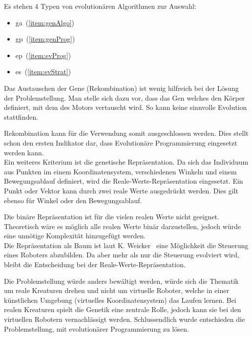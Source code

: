     Es stehen 4 Typen von evolutionären Algorithmen zur Auswahl:

    \begin{itemize}
      \item \acrfull{ga}~(\vref{item:genAlgo})
      \item \acrfull{gp}~(\vref{item:genProg})
      \item \acrfull{ep}~(\vref{item:evProg})
      \item \acrfull{es}~(\vref{item:evStrat})
    \end{itemize}

    Das Austauschen der Gene (Rekombination) ist wenig hilfreich bei der Lösung der Problemstellung.
    Man stelle sich dazu vor, dass das Gen welches den Körper definiert, mit dem des Motors vertauscht wird.
    So kann keine sinnvolle Evolution stattfinden.

    \medskip

    Rekombination kann für die Verwendung somit ausgeschlossen werden.
    Dies stellt schon den ersten Indikator dar, dass Evolutionäre Programmierung eingesetzt werden kann.
    \\
    Ein weiteres Kriterium ist die genetische Repräsentation.
    Da sich das Individuum aus Punkten im einem Koordinatensystem,
    verschiedenen Winkeln und einem Bewegungsablauf definiert, wird die Reale-Werte-Repräsentation eingesetzt.
    Ein Punkt oder Vektor kann durch zwei reale Werte ausgedrückt werden.
    Dies gilt ebenso für Winkel oder den Bewegungsablauf.

    \medskip

    Die binäre Repräsentation ist für die vielen realen Werte nicht geeignet.
    Theoretisch wäre es möglich alle realen Werte binär darzustellen,
    jedoch würde eine unnötige Komplexität hinzugefügt werden.
    \\
    Die Repräsentation als Baum ist laut K. Weicker~\cite{book:evAlgo} eine Möglichkeit die Steuerung eines Roboters abzubilden.
    Da aber mehr als nur die Steuerung evolviert wird, bleibt die Entscheidung bei der Reale-Werte-Repräsentation.

    \medskip

    Die Problemstellung würde anders bewältigt werden,
    würde sich die Thematik um reale Kreaturen drehen und nicht um virtuelle Roboter,
    welche in einer künstlichen Umgebung (virtuelles Koordinatensystem) das Laufen lernen.
    Bei realen Kreaturen spielt die Genetik eine zentrale Rolle,
    jedoch kann sie bei den virtuellen Robotern vernachlässigt werden.
    Schlussendlich wurde entschieden die Problemstellung, mit evolutionärer Programmierung zu lösen.

